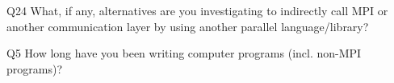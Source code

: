 \begin{description}%
\item{Q24} What, if any, alternatives are you investigating to indirectly call MPI or another communication layer by using another parallel language/library?%
\item{Q5} How long have you been writing computer programs (incl. non-MPI programs)?%
\end{description}%
